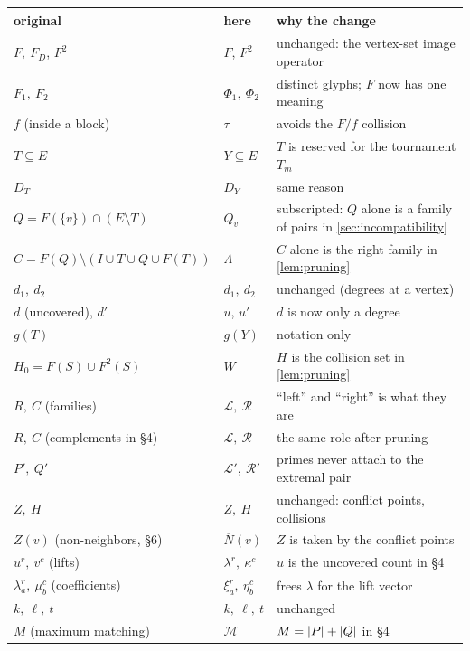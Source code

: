 {\small
\renewcommand{\arraystretch}{1.15}
\begin{center}
\begin{tabular}{@{}llp{6.2cm}@{}}
\toprule
original & here & why the change \\
\midrule
$F,\ F_D$, $F^2$ & $F$, $F^2$ & unchanged: the vertex-set image operator \\
$F_1,\ F_2$ & $\Phi_1,\ \Phi_2$ & distinct glyphs; $F$ now has one meaning \\
$f$ (inside a block) & $\tau$ & avoids the $F/f$ collision \\
$T\subseteq E$ & $Y\subseteq E$ & $T$ is reserved for the tournament $T_m$ \\
$D_T$ & $D_Y$ & same reason \\
$Q=F(\{v\})\cap(E\setminus T)$ & $Q_v$ & subscripted: $Q$ alone is a family of pairs in \cref{sec:incompatibility} \\
$C=F(Q)\setminus(I\cup T\cup Q\cup F(T))$ & $\Lambda$ & $C$ alone is the right family in \cref{lem:pruning} \\
$d_1,\ d_2$ & $d_1,\ d_2$ & unchanged (degrees at a vertex) \\
$d$ (uncovered), $d'$ & $u$, $u'$ & $d$ is now only a degree \\
$g(T)$ & $g(Y)$ & notation only \\
$H_0=F(S)\cup F^2(S)$ & $W$ & $H$ is the collision set in \cref{lem:pruning} \\
$R,\ C$ (families) & $\mathcal L,\ \mathcal R$ & ``left'' and ``right'' is what they are \\
$R,\ C$ (complements in \S4) & $\mathcal L,\ \mathcal R$ & the same role after pruning \\
$P',\ Q'$ & $\mathcal L',\ \mathcal R'$ & primes never attach to the extremal pair \\
$Z,\ H$ & $Z,\ H$ & unchanged: conflict points, collisions \\
$Z(v)$ (non-neighbors, \S6) & $\overline N(v)$ & $Z$ is taken by the conflict points \\
$u^r,\ v^c$ (lifts) & $\lambda^r,\ \kappa^c$ & $u$ is the uncovered count in \S4 \\
$\lambda^r_a,\ \mu^c_b$ (coefficients) & $\xi^r_a,\ \eta^c_b$ & frees $\lambda$ for the lift vector \\
$k,\ \ell,\ t$ & $k,\ \ell,\ t$ & unchanged \\
$M$ (maximum matching) & $\mathcal M$ & $M=\lvert P\rvert+\lvert Q\rvert$ in \S4 \\
\bottomrule
\end{tabular}
\end{center}}


